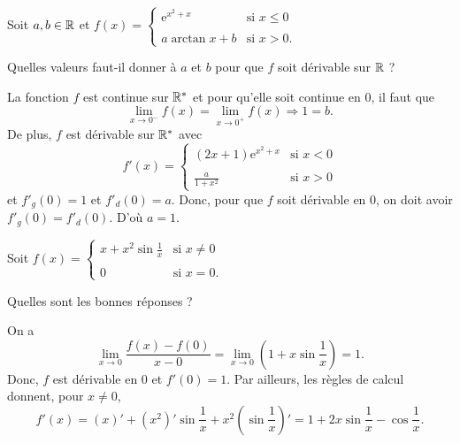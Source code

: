 \begin{question}

Soit $a,b\in \mathbb{R}$ et $f(x)=\left\{\begin{array}{cl}\displaystyle \mathrm{e}^{x^2+x}&\mbox{si }x\leq 0\\ \\ a \arctan x+b &\mbox{si }x>0.\end{array}\right.$

Quelles valeurs faut-il donner à $a$ et $b$ pour que $f$ soit dérivable sur $\mathbb{R}$ ?
\begin{answers}  
\end{answers}
\begin{explanations}
La fonction $f$ est continue sur $\mathbb{R}^*$ et pour qu'elle soit continue en $0$, il faut que
$$\lim _{x\to 0^-}f(x)=\lim _{x\to 0^+}f(x)\Rightarrow 1=b.$$ 
De plus, $f$ est dérivable sur $\mathbb{R}^*$ avec
$$f'(x)=\left\{\begin{array}{cl}\displaystyle (2x+1)\mathrm{e}^{x^2+x}&\mbox{si }x<0\\ \\ \displaystyle \frac{a}{1+x^2} &\mbox{si }x>0\end{array}\right.$$
et $f'_g(0)=1$ et $f'_d(0)=a$. Donc, pour que $f$ soit dérivable en $0$, on doit avoir $f'_g(0)=f'_d(0)$. D'où $a=1$.
\end{explanations}
\end{question}



\begin{question}

Soit $f(x)=\left\{\begin{array}{cl}\displaystyle x+x^2\sin \frac{1}{x}&\mbox{si }x\neq 0\\ \\ 0&\mbox{si }x=0.\end{array}\right.$

Quelles sont les bonnes réponses ?
\begin{answers}  
\end{answers}
\begin{explanations}
On a
$$\lim_{x\to 0}\frac{f(x)-f(0)}{x-0}=\lim_{x\to 0}\left(1+x\sin \frac{1}{x}\right)=1.$$
Donc, $f$ est dérivable en $0$ et $f'(0)=1$. Par ailleurs, les règles de calcul donnent, pour $x\neq 0$,
$$f'(x)=(x)'+(x^2)'\sin \frac{1}{x}+x^2\left(\sin \frac{1}{x}\right)'=1+2x\sin \frac{1}{x}-\cos \frac{1}{x}.$$
\end{explanations}
\end{question}




